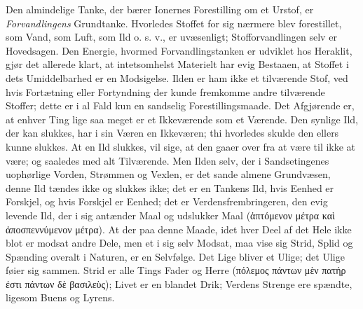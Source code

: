 \documentclass[12pt,a4paper]{book}
\begin{document}
Den almindelige Tanke, der bærer Ionernes Forestilling om et Urstof, er
\emph{Forvandlingens} Grundtanke. Hvorledes Stoffet for sig nærmere blev
forestillet, som Vand, som Luft, som Ild o. s. v., er uvæsenligt;
Stofforvandlingen selv er Hovedsagen. Den Energie, hvormed Forvandlingstanken
er udviklet hos Heraklit, gjør det allerede klart, at intetsomhelst Materielt
har evig Bestaaen, at Stoffet i dets Umiddelbarhed er en Modsigelse. Ilden er
ham ikke et tilværende Stof, ved hvis Fortætning eller Fortyndning der kunde
fremkomme andre tilværende Stoffer; dette er i al Fald kun en sandselig
Forestillingsmaade. Det Afgjørende er, at enhver Ting lige saa meget er et
Ikkeværende som et Værende. Den synlige Ild, der kan slukkes, har i sin Væren
en Ikkeværen; thi hvorledes skulde den ellers kunne slukkes. At en Ild
slukkes, vil sige, at den gaaer over fra at være til ikke at være; og saaledes
med alt Tilværende. Men Ilden selv, der i Sandsetingenes uophørlige Vorden,
Strømmen og Vexlen, er det sande almene Grundvæsen, denne Ild tændes ikke og
slukkes ikke; det er en Tankens Ild, hvis Eenhed er Forskjel, og hvis Forskjel
er Eenhed; det er Verdensfrembringeren, den evig levende Ild, der i sig
antænder Maal og udslukker Maal (ἁπτόμενον μέτρα καὶ ἀποσπεννύμενον μέτρα).
At der paa denne Maade, idet hver Deel af det Hele ikke blot er modsat andre
Dele, men et i sig selv Modsat, maa vise sig Strid, Splid og Spænding overalt
i Naturen, er en Selvfølge. Det Lige bliver et Ulige; det
Ulige føier sig sammen. Strid er alle Tings Fader og Herre
(πόλεμος πάντων μὲν πατήρ ἐστι πάντων δὲ βασιλεὺς); Livet er en blandet Drik;
Verdens Strenge ere spændte, ligesom Buens og Lyrens.
\end{document}
